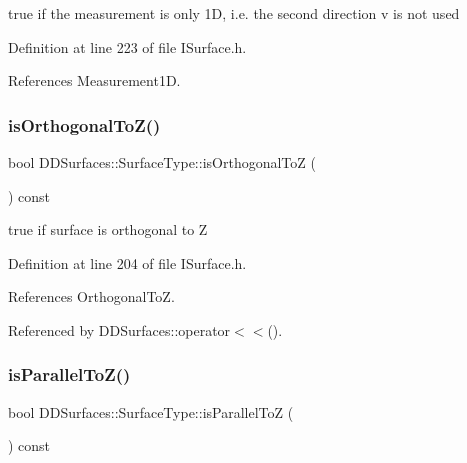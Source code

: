 true if the measurement is only 1D, i.\+e. the second direction v is not used 



Definition at line 223 of file I\+Surface.\+h.



References Measurement1D.

\hypertarget{class_d_d_surfaces_1_1_surface_type_a748cc10a2f80c209ffb257590787e28c}{}\label{class_d_d_surfaces_1_1_surface_type_a748cc10a2f80c209ffb257590787e28c} 
\subsubsection{\texorpdfstring{is\+Orthogonal\+To\+Z()}{isOrthogonalToZ()}}
{\footnotesize\ttfamily bool D\+D\+Surfaces\+::\+Surface\+Type\+::is\+Orthogonal\+ToZ (\begin{DoxyParamCaption}{ }\end{DoxyParamCaption}) const\hspace{0.3cm}{\ttfamily [inline]}}



true if surface is orthogonal to Z 



Definition at line 204 of file I\+Surface.\+h.



References Orthogonal\+ToZ.



Referenced by D\+D\+Surfaces\+::operator$<$$<$().

\hypertarget{class_d_d_surfaces_1_1_surface_type_a1e22236a499e5825782138d9bdcb6889}{}\label{class_d_d_surfaces_1_1_surface_type_a1e22236a499e5825782138d9bdcb6889} 
\subsubsection{\texorpdfstring{is\+Parallel\+To\+Z()}{isParallelToZ()}}
{\footnotesize\ttfamily bool D\+D\+Surfaces\+::\+Surface\+Type\+::is\+Parallel\+ToZ (\begin{DoxyParamCaption}{ }\end{DoxyParamCaption}) const\hspace{0.3cm}{\ttfamily [inline]}}




